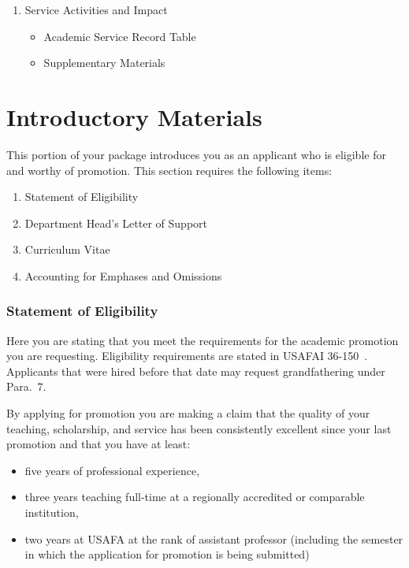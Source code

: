 \documentclass[11pt,titlepage]{article}
\let\cite=\citep\relax
\begin{document}
\begin{enumerate}
  \item Service Activities and Impact
  \begin{itemize}[label=$\square$]
    \item Academic Service Record Table
    \item Supplementary Materials
  \end{itemize}
\end{enumerate}

\part{Introductory Materials}  %

This portion of your package introduces you as an applicant who is eligible for and worthy of promotion.
This section requires the following items:
\begin{enumerate}
  \item Statement of Eligibility
  \item Department Head's Letter of Support
  \item Curriculum Vitae
  \item Accounting for Emphases and Omissions
\end{enumerate}

\section{Statement of Eligibility}  %
Here you are stating that you meet the requirements for the academic promotion you are requesting.
Eligibility requirements are stated in USAFAI 36-150~\cite{usafai36-150}.
Applicants that were hired before that date may request grandfathering under Para.~7.

By applying for promotion you are making a claim that the quality of your teaching, scholarship, and service has been consistently excellent since your last promotion and that you have at least:
\begin{itemize}
  \item five years of professional experience,
  \item three years teaching full-time at a regionally accredited or comparable institution,
  \item two years at USAFA at the rank of assistant professor (including the semester in which the application for promotion is being submitted)
\end{itemize}
\end{document}
